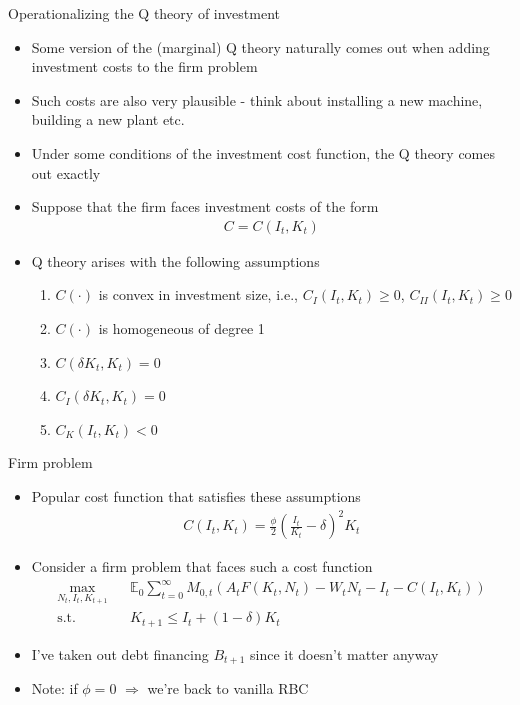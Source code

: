 \documentclass[9pt,xcolor={dvipsnames}]{beamer}
\newcommand{\bit}{\begin{itemize}}
\newcommand{\eit}{\end{itemize}}
\newcommand{\ben}{\begin{enumerate}}
\newcommand{\een}{\end{enumerate}}
\begin{document}
\begin{frame}{Operationalizing the Q theory of investment}

\bit
\setlength\itemsep{1em}

\item Some version of the (marginal) Q theory naturally comes out when adding investment costs to the firm problem

\item Such costs are also very plausible - think about installing a new machine, building a new plant etc.

\item Under some conditions of the investment cost function, the Q theory comes out exactly

\item Suppose that the firm faces investment costs of the form
\begin{eqnarray}
C = C(I_t, K_t) \nonumber
\end{eqnarray}

\item Q theory arises with the following assumptions
\ben
	\item $C(\cdot)$ is convex in investment size, i.e., $C_I(I_t, K_t) \geq 0 $, $C_{II}(I_t, K_t) \geq 0 $

	\item $C(\cdot)$ is homogeneous of degree 1
	
	\item $C(\delta K_t, K_t) = 0$
	
	\item $C_{I}(\delta K_t, K_t) = 0$

	\item $C_K(I_t, K_t) < 0 $
\een


\eit

\end{frame}


\begin{frame}{Firm problem}

\bit
\setlength\itemsep{2em}

\item Popular cost function that satisfies these assumptions
\begin{eqnarray}
C(I_t, K_t) = \frac{\phi}{2} \left(\frac{I_t}{K_t}-\delta\right)^2K_t \nonumber
\end{eqnarray}

\item Consider a firm problem that faces such a cost function
\begin{eqnarray}
\max_{N_t, I_t, K_{t+1}} && \mathbb E_0 \sum_{t=0}^{\infty} M_{0, t} \left(A_t F(K_t, N_t) - W_t N_t - I_t -C(I_t, K_t) \right) \nonumber \\
\text{s.t.} && K_{t+1} \leq I_t + (1-\delta) K_t \nonumber
\end{eqnarray}

\item I've taken out debt financing $B_{t+1}$ since it doesn't matter anyway

\item Note: if $\phi=0$ $\Rightarrow$ we're back to vanilla RBC

\eit

\end{frame}
\end{document}
